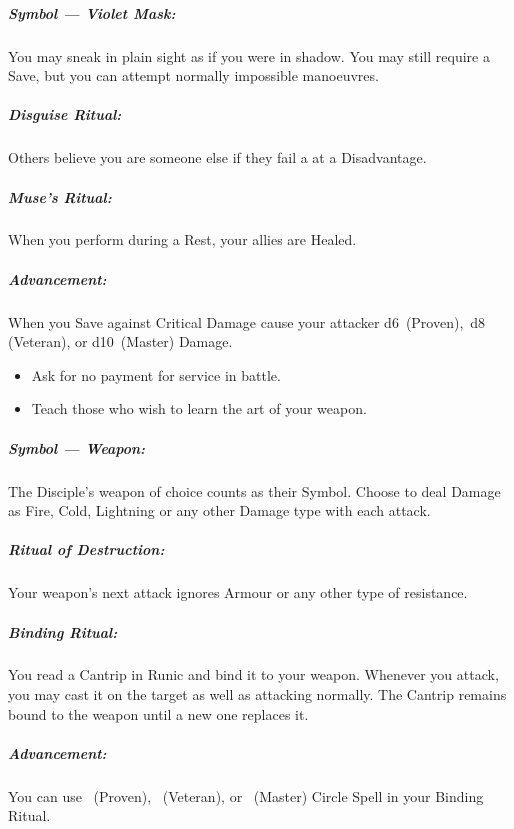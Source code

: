 \documentclass[itdr/core]{subfiles}
\begin{document}
\subparagraph{Symbol --- Violet Mask:} You may sneak in plain sight as if you were in shadow. You may still require a Save, but you can attempt normally impossible manoeuvres.

\subparagraph{Disguise Ritual:} Others believe you are someone else if they fail a  at a Disadvantage.

\subparagraph{Muse's Ritual:} When you perform during a Rest, your allies are Healed.

\subparagraph{Advancement:} When you Save against Critical Damage cause your attacker d6~(Proven),~d8 (Veteran), or d10~(Master) Damage.

\vspace{4ex}

{\em\begin{itemize}
		\item Ask for no payment for service in battle.
		\item Teach those who wish to learn the art of your weapon.
\end{itemize}}

\subparagraph{Symbol --- Weapon:} The Disciple's weapon of choice counts as their Symbol. Choose to deal Damage as Fire, Cold, Lightning or any other Damage type with each attack.

\subparagraph{Ritual of Destruction:} Your weapon's next attack ignores Armour or any other type of resistance.

\subparagraph{Binding Ritual:} You read a Cantrip in Runic and bind it to your weapon. Whenever you attack, you may cast it on the target as well as attacking normally. The Cantrip remains bound to the weapon until a new one replaces it.

\subparagraph{Advancement:} You can use ~(Proven), ~(Veteran), or ~(Master) Circle Spell in your Binding Ritual.

\break


\begin{comment}

\creed{???}
{\em\begin{itemize}
\item ???
\item ???
\end{itemize}}

\subparagraph{Symbol --- ???:}

\subparagraph{??? Ritual:}

\subparagraph{??? Ritual:}

\subparagraph{Advancement:}

\end{comment}
\end{document}
